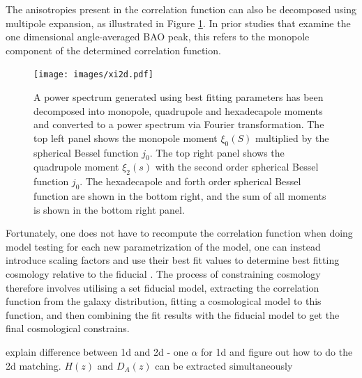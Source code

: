 \documentclass[titlesmallcaps, examinerscopy, copyrightpage]{uqthesis}
\newcommand{\red}{\color{red}}
\begin{document}
The anisotropies present in the correlation function can also be decomposed using multipole expansion, as illustrated in Figure \ref{fig:xi2d}. In prior studies that examine the one dimensional angle-averaged BAO peak, this refers to the monopole component of the determined correlation function.

\begin{figure}[h!]
  \begin{center}
    \texttt{[image: images/xi2d.pdf]}
  \end{center}
  \caption{A power spectrum generated using best fitting \citet{Planck201416} parameters has been decomposed into monopole, quadrupole and hexadecapole moments and converted to a power spectrum via Fourier transformation. The top left panel shows the monopole moment $\xi_0(S)$ multiplied by the spherical Bessel function $j_0$. The top right panel shows the quadrupole moment $\xi_2(s)$ with the second order spherical Bessel function $j_0$. The hexadecapole and forth order spherical Bessel function are shown in the bottom right, and the sum of all moments is shown in the bottom right panel.}
  \label{fig:xi2d}
\end{figure}


Fortunately, one does not have to recompute the correlation function when doing model testing for each new parametrization of the model, one can instead introduce scaling factors and use their best fit values to determine best fitting cosmology relative to the fiducial \citep{SanchezScoccola2012}. The process of constraining cosmology therefore involves utilising a set fiducial model, extracting the correlation function from the galaxy distribution, fitting a cosmological model to this function, and then combining the fit results with the fiducial model to get the final cosmological constrains.






{\red explain difference between 1d and 2d - one $\alpha$ for 1d and figure out how to do the 2d matching. $H(z)$ and $D_A(z)$ can be extracted simultaneously }
\end{document}
